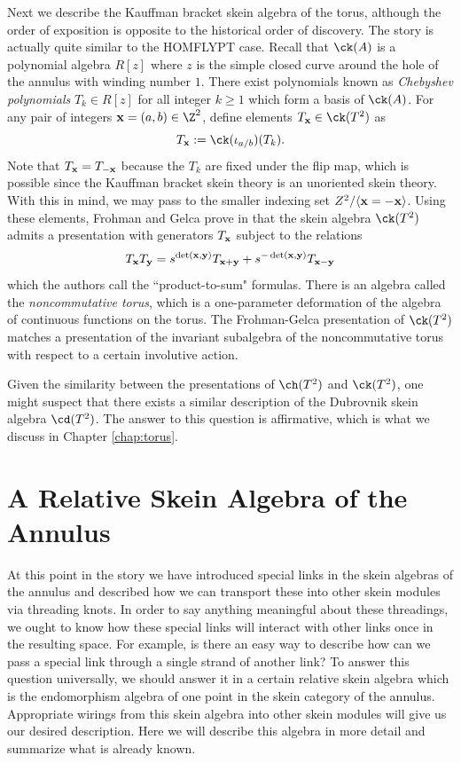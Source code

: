 Next we describe the Kauffman bracket skein algebra of the torus, although the order of exposition is opposite to the historical order of discovery. The story is actually quite similar to the HOMFLYPT case. Recall that $\ck(A)$ is a polynomial algebra $R[z]$ where $z$ is the simple closed curve around the hole of the annulus with winding number $1$. There exist polynomials known as \textit{Chebyshev polynomials} $T_k \in R[z]$ for all integer $k \geq 1$ which form a basis of $\ck(A)$. For any pair of integers $\xx = (a, b) \in \Z^2$, define elements $T_\xx \in \ck(T^2)$ as 
\[
T_\xx := \ck(\iota_{a/b})(T_k).
\]
Note that $T_{\mathbf{x}} = T_{-{\mathbf{x}}}$ because the $T_k$ are fixed under the flip map, which is possible since the Kauffman bracket skein theory is an unoriented skein theory. With this in mind, we may pass to the smaller indexing set $Z^2 / \langle {\mathbf{x}} = -{\mathbf{x}} \rangle$. Using these elements, Frohman and Gelca prove in \cite{FG00} that the skein algebra $\ck(T^2)$ admits a presentation with generators $T_{\mathbf{x}}$ subject to the relations
\[
T_{\mathbf{x}} T_{\mathbf{y}} = s^{\det({\mathbf{x}}, {\mathbf{y}})} T_{{\mathbf{x}} + {\mathbf{y}}} + s^{-\det({\mathbf{x}}, {\mathbf{y}})} T_{{\mathbf{x}} - {\mathbf{y}}}
\]
which the authors call the ``product-to-sum" formulas. There is an algebra called the \textit{noncommutative torus}, which is a one-parameter deformation of the algebra of continuous functions on the torus. The Frohman-Gelca presentation of $\ck(T^2)$ matches a presentation of the invariant subalgebra of the noncommutative torus with respect to a certain involutive action. 

Given the similarity between the presentations of $\ch(T^2)$ and $\ck(T^2)$, one might suspect that there exists a similar description of the Dubrovnik skein algebra $\cd(T^2)$. The answer to this question is affirmative, which is what we discuss in Chapter \ref{chap:torus}.


\section{A Relative Skein Algebra of the Annulus} \label{sec:relativeannulus}

At this point in the story we have introduced special links in the skein algebras of the annulus and described how we can transport these into other skein modules via threading knots. In order to say anything meaningful about these threadings, we ought to know how these special links will interact with other links once in the resulting space. For example, is there an easy way to describe how can we pass a special link through a single strand of another link? To answer this question universally, we should answer it in a certain relative skein algebra which is the endomorphism algebra of one point in the skein category of the annulus. Appropriate wirings from this skein algebra into other skein modules will give us our desired description. Here we will describe this algebra in more detail and summarize what is already known. 


